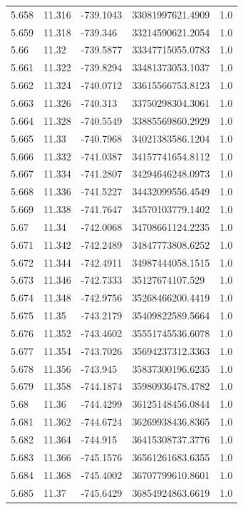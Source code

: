 \begin{tabular}{lllll}
5.658 & 11.316 & -739.1043 & 33081997621.4909 & 1.0 \\
5.659 & 11.318 & -739.346 & 33214590621.2054 & 1.0 \\
5.66 & 11.32 & -739.5877 & 33347715055.0783 & 1.0 \\
5.661 & 11.322 & -739.8294 & 33481373053.1037 & 1.0 \\
5.662 & 11.324 & -740.0712 & 33615566753.8123 & 1.0 \\
5.663 & 11.326 & -740.313 & 33750298304.3061 & 1.0 \\
5.664 & 11.328 & -740.5549 & 33885569860.2929 & 1.0 \\
5.665 & 11.33 & -740.7968 & 34021383586.1204 & 1.0 \\
5.666 & 11.332 & -741.0387 & 34157741654.8112 & 1.0 \\
5.667 & 11.334 & -741.2807 & 34294646248.0973 & 1.0 \\
5.668 & 11.336 & -741.5227 & 34432099556.4549 & 1.0 \\
5.669 & 11.338 & -741.7647 & 34570103779.1402 & 1.0 \\
5.67 & 11.34 & -742.0068 & 34708661124.2235 & 1.0 \\
5.671 & 11.342 & -742.2489 & 34847773808.6252 & 1.0 \\
5.672 & 11.344 & -742.4911 & 34987444058.1515 & 1.0 \\
5.673 & 11.346 & -742.7333 & 35127674107.529 & 1.0 \\
5.674 & 11.348 & -742.9756 & 35268466200.4419 & 1.0 \\
5.675 & 11.35 & -743.2179 & 35409822589.5664 & 1.0 \\
5.676 & 11.352 & -743.4602 & 35551745536.6078 & 1.0 \\
5.677 & 11.354 & -743.7026 & 35694237312.3363 & 1.0 \\
5.678 & 11.356 & -743.945 & 35837300196.6235 & 1.0 \\
5.679 & 11.358 & -744.1874 & 35980936478.4782 & 1.0 \\
5.68 & 11.36 & -744.4299 & 36125148456.0844 & 1.0 \\
5.681 & 11.362 & -744.6724 & 36269938436.8365 & 1.0 \\
5.682 & 11.364 & -744.915 & 36415308737.3776 & 1.0 \\
5.683 & 11.366 & -745.1576 & 36561261683.6355 & 1.0 \\
5.684 & 11.368 & -745.4002 & 36707799610.8601 & 1.0 \\
5.685 & 11.37 & -745.6429 & 36854924863.6619 & 1.0 \\

\end{tabular}
